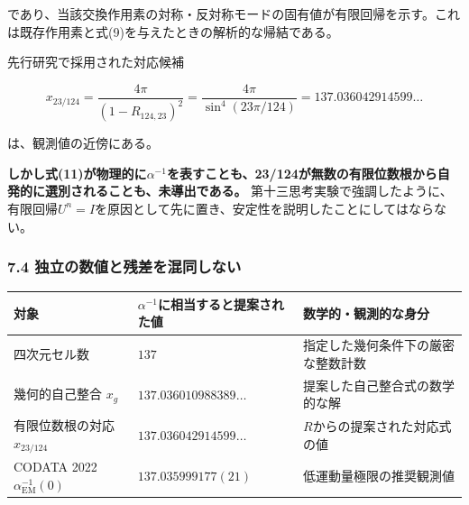 \documentclass[
  a4paper,
]{ltjsarticle}
\newcounter{none} %
\begin{document}
であり、当該交換作用素の対称・反対称モードの固有値が有限回帰を示す。これは既存作用素と式(9)を与えたときの解析的な帰結である。

先行研究で採用された対応候補

\[
x_{23/124}=\frac{4\pi}{(1-R_{124,23})^2}
=\frac{4\pi}{\sin^4(23\pi/124)}
=137.036042914599\ldots
\tag{11}
\]

は、観測値の近傍にある。

\textbf{しかし式(11)が物理的に\(\alpha^{-1}\)を表すことも、23/124が無数の有限位数根から自発的に選別されることも、未導出である。}
第十三思考実験で強調したように、有限回帰\(U^n=I\)を原因として先に置き、安定性を説明したことにしてはならない。

\subsubsection{7.4
独立の数値と残差を混同しない}\label{ux72ecux7acbux306eux6570ux5024ux3068ux6b8bux5deeux3092ux6df7ux540cux3057ux306aux3044}

{\def\LTcaptype{none} %
\begin{longtable}[]{@{}
  >{\raggedright\arraybackslash}p{}
  >{\raggedleft\arraybackslash}p{}
  >{\raggedright\arraybackslash}p{}@{}}
\toprule\noalign{}
\begin{minipage}[b]{\linewidth}\raggedright
対象
\end{minipage} & \begin{minipage}[b]{\linewidth}\raggedleft
\(\alpha^{-1}\)に相当すると提案された値
\end{minipage} & \begin{minipage}[b]{\linewidth}\raggedright
数学的・観測的な身分
\end{minipage} \\
\midrule\noalign{}
\endhead
\bottomrule\noalign{}
\endlastfoot
四次元セル数 & \(137\) & 指定した幾何条件下の厳密な整数計数 \\
幾何的自己整合 \(x_g\) & \(137.036010988389\ldots\) &
提案した自己整合式の数学的な解 \\
有限位数根の対応 \(x_{23/124}\) & \(137.036042914599\ldots\) &
\(R\)からの提案された対応式の値 \\
CODATA 2022 \(\alpha_{\mathrm{EM}}^{-1}(0)\) & \(137.035999177(21)\) &
低運動量極限の推奨観測値 \\
\end{longtable}
}
\end{document}

